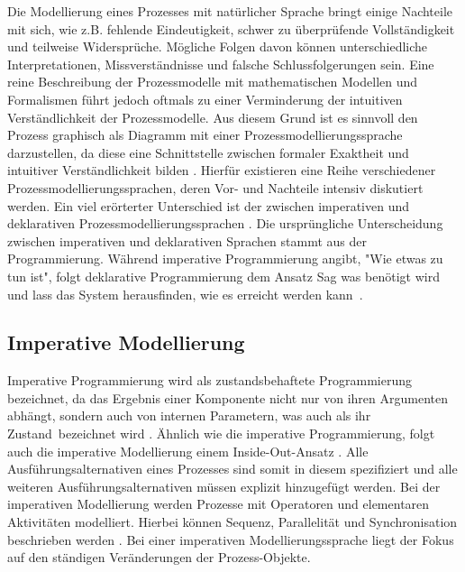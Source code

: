 Die Modellierung eines Prozesses mit natürlicher Sprache bringt einige Nachteile mit sich, wie z.B. fehlende Eindeutigkeit, schwer zu überprüfende Vollständigkeit und teilweise Widersprüche. Mögliche Folgen davon können unterschiedliche Interpretationen, Missverständnisse und falsche Schlussfolgerungen sein. Eine reine Beschreibung der Prozessmodelle mit mathematischen Modellen und Formalismen führt jedoch oftmals zu einer Verminderung der intuitiven Verständlichkeit der Prozessmodelle. Aus diesem Grund ist es sinnvoll den Prozess graphisch als Diagramm mit einer Prozessmodellierungssprache darzustellen, da diese eine Schnittstelle zwischen formaler Exaktheit und intuitiver Verständlichkeit bilden \cite{thomas2009,kircher2006}.  \newline
Hierfür existieren eine Reihe verschiedener Prozessmodellierungssprachen, deren Vor- und Nachteile intensiv diskutiert werden. Ein viel erörterter Unterschied ist der zwischen imperativen und deklarativen Prozessmodellierungssprachen \cite{fahland2010}. \newline
Die ursprüngliche Unterscheidung zwischen imperativen und deklarativen Sprachen stammt aus der Programmierung. Während imperative Programmierung angibt, "Wie etwas zu tun ist", folgt deklarative Programmierung dem Ansatz \grqq Sag was benötigt wird und lass das System herausfinden, wie es erreicht werden kann\grqq \ \cite{pichler2012}.

\subsection{Imperative Modellierung}
Imperative Programmierung wird als zustandsbehaftete Programmierung bezeichnet, da das  Ergebnis einer Komponente nicht nur von ihren Argumenten abhängt, sondern auch von internen Parametern, was auch als ihr \grqq Zustand\grqq \  bezeichnet wird \cite{fahland2010}.  \newline
Ähnlich wie die imperative Programmierung, folgt auch die imperative Modellierung einem \grqq Inside-Out-Ansatz \grqq. Alle Ausführungsalternativen eines Prozesses sind somit in diesem spezifiziert und alle weiteren Ausführungsalternativen müssen explizit hinzugefügt werden. Bei der imperativen Modellierung werden Prozesse mit Operatoren und elementaren Aktivitäten modelliert. Hierbei können Sequenz, Parallelität und Synchronisation beschrieben werden \cite{kaschek1998}. Bei einer imperativen Modellierungssprache liegt der Fokus auf den ständigen Veränderungen der Prozess-Objekte.

